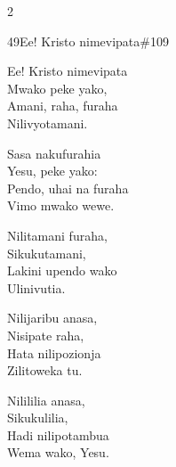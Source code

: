 \documentclass{article}
\begin{document}
\begin{multicols}{2}
\begin{hymn}{49}{Ee! Kristo nimevipata}{\#109}
\begin{stanza}
Ee! Kristo nimevipata\\
Mwako peke yako,\\
Amani, raha, furaha\\
Nilivyotamani.
\end{stanza}
\begin{chorus}
Sasa nakufurahia\\
Yesu, peke yako:\\
Pendo, uhai na furaha\\
Vimo mwako wewe.
\end{chorus}
\begin{stanza}
Nilitamani furaha,\\
Sikukutamani,\\
Lakini upendo wako\\
Ulinivutia.
\end{stanza}
\begin{stanza}
Nilijaribu anasa,\\
Nisipate raha,\\
Hata nilipozionja\\
Zilitoweka tu.
\end{stanza}
\begin{stanza}
Nilililia anasa,\\
Sikukulilia,\\
Hadi nilipotambua\\
Wema wako, Yesu.
\end{stanza}
\end{hymn}


\end{multicols}
\end{document}
